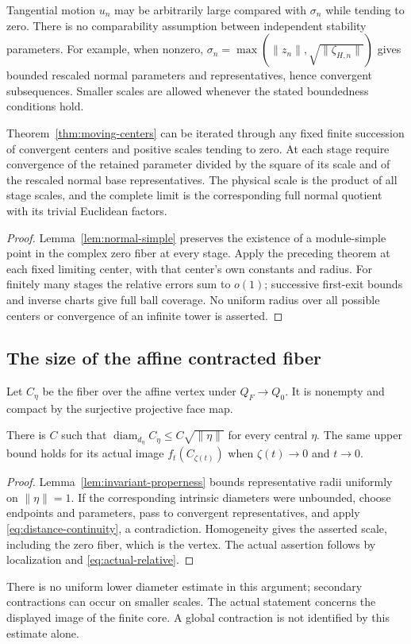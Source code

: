 Tangential motion $u_n$ may be arbitrarily large compared with
$\sigma_n$ while tending to zero. There is no comparability
assumption between independent stability parameters.
For example, when nonzero,
$\sigma_n=\max(\|z_n\|,\sqrt{\|\zeta_{H,n}\|})$ gives bounded
rescaled normal parameters and representatives, hence convergent
subsequences. Smaller scales are allowed whenever the stated
boundedness conditions hold.

\begin{corollary}\label{cor:iterated-limits}
Theorem~\ref{thm:moving-centers} can be iterated through any fixed
finite succession of convergent centers and positive scales tending
to zero. At each stage require convergence of the retained parameter
divided by the square of its scale and of the rescaled normal base
representatives. The physical scale is the product of all stage
scales, and the complete limit is the corresponding full normal
quotient with its trivial Euclidean factors.
\end{corollary}
\begin{proof}
Lemma~\ref{lem:normal-simple} preserves the existence of a module-simple point in the complex zero fiber
at every stage. Apply the preceding theorem at each fixed limiting
center, with that center's own constants and radius.
For finitely many stages the relative errors sum to $o(1)$;
successive first-exit bounds and inverse charts give full ball
coverage. No uniform radius over all possible centers or convergence
of an infinite tower is asserted.
\end{proof}

\subsection{The size of the affine contracted fiber}
Let $C_\eta$ be the fiber over the affine vertex under
$Q_F\to Q_0$. It is nonempty and compact by the surjective projective
face map.
\begin{corollary}\label{cor:uniform-core}
There is $C$ such that
$\operatorname{diam}_{d_\eta}C_\eta\le C\sqrt{\|\eta\|}$
for every central $\eta$.
The same upper bound holds for its actual image $f_t(C_{\zeta(t)})$
when $\zeta(t)\to0$ and $t\to0$.
\end{corollary}
\begin{proof}
Lemma~\ref{lem:invariant-properness} bounds representative radii
uniformly on $\|\eta\|=1$.
If the corresponding intrinsic diameters were unbounded, choose
endpoints and parameters, pass to convergent representatives, and
apply \eqref{eq:distance-continuity}, a contradiction.
Homogeneity gives the asserted scale, including the zero fiber,
which is the vertex. The actual assertion follows by localization
and \eqref{eq:actual-relative}.
\end{proof}
There is no uniform lower diameter estimate in this argument;
secondary contractions can occur on smaller scales.
The actual statement concerns the displayed image of the finite
core. A global contraction is not identified by this estimate alone.

